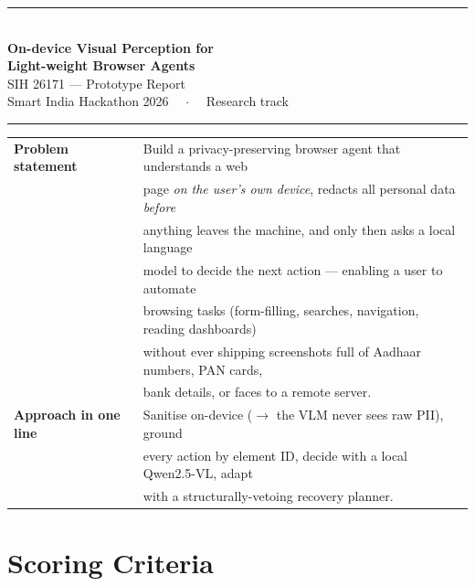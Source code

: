 \documentclass[11pt,a4paper]{article}
\renewcommand{\arraystretch}{1.2}
\begin{document}
\begin{center}
  {\color{primary}\rule{\linewidth}{1.5pt}}\\[6pt]
  {\LARGE\bfseries\color{primary} On-device Visual Perception for\\[2pt] Light-weight Browser Agents}\\[8pt]
  {\large SIH 26171 --- Prototype Report}\\[6pt]
  {\normalsize Smart India Hackathon 2026 ~~$\cdot$~~ Research track}\\[10pt]
  {\color{primary}\rule{\linewidth}{0.6pt}}
\end{center}

\begin{center}
\renewcommand{\arraystretch}{1.5}
\begin{tabular}{@{}ll@{}}
  \textbf{Problem statement} & Build a privacy-preserving browser agent that understands a web\\
  & page \emph{on the user's own device}, redacts all personal data \emph{before}\\
  & anything leaves the machine, and only then asks a local language\\
  & model to decide the next action --- enabling a user to automate\\
  & browsing tasks (form-filling, searches, navigation, reading dashboards)\\
  & without ever shipping screenshots full of Aadhaar numbers, PAN cards,\\
  & bank details, or faces to a remote server.\\[2pt]
  \textbf{Approach in one line} & Sanitise on-device ($\rightarrow$ the VLM never sees raw PII), ground\\
  & every action by element ID, decide with a local Qwen2.5-VL, adapt\\
  & with a structurally-vetoing recovery planner.\\
\end{tabular}
\end{center}

\vspace{4pt}

\section{Scoring Criteria}
\end{document}
